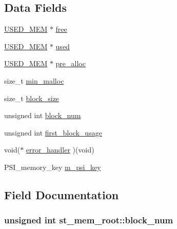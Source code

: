 \subsection*{Data Fields}
\begin{DoxyCompactItemize}
\item 
\hyperlink{my__alloc_8h_adcee356751476eb8212d707ab71a525c}{U\+S\+E\+D\+\_\+\+M\+E\+M} $\ast$ \hyperlink{structst__mem__root_a589eeca4f55433bbbce712b16d437d9b}{free}
\item 
\hyperlink{my__alloc_8h_adcee356751476eb8212d707ab71a525c}{U\+S\+E\+D\+\_\+\+M\+E\+M} $\ast$ \hyperlink{structst__mem__root_a119bc46a5b34383d7a82c32d7c1b9077}{used}
\item 
\hyperlink{my__alloc_8h_adcee356751476eb8212d707ab71a525c}{U\+S\+E\+D\+\_\+\+M\+E\+M} $\ast$ \hyperlink{structst__mem__root_ac93aa644c9eae6a4260929234d460117}{pre\+\_\+alloc}
\item 
size\+\_\+t \hyperlink{structst__mem__root_ae20a32941b57232d2fcf86e94ebb289e}{min\+\_\+malloc}
\item 
size\+\_\+t \hyperlink{structst__mem__root_a719ac747366fcfeef5dbd164fceaacdd}{block\+\_\+size}
\item 
unsigned int \hyperlink{structst__mem__root_a67bc70b3e0703bbab62a143ba407ddb8}{block\+\_\+num}
\item 
unsigned int \hyperlink{structst__mem__root_a6d11a091d78fba6e427962ed2521d048}{first\+\_\+block\+\_\+usage}
\item 
void($\ast$ \hyperlink{structst__mem__root_aed812c144fbd9a5f1281e693729db75d}{error\+\_\+handler} )(void)
\item 
P\+S\+I\+\_\+memory\+\_\+key \hyperlink{structst__mem__root_afd13e15db0a42ca22e6f20c33d4e9fb3}{m\+\_\+psi\+\_\+key}
\end{DoxyCompactItemize}


\subsection{Field Documentation}
\hypertarget{structst__mem__root_a67bc70b3e0703bbab62a143ba407ddb8}{}
\subsubsection[{block\+\_\+num}]{\setlength{\rightskip}{0pt plus 5cm}unsigned int st\+\_\+mem\+\_\+root\+::block\+\_\+num}\label{structst__mem__root_a67bc70b3e0703bbab62a143ba407ddb8}
\hypertarget{structst__mem__root_a719ac747366fcfeef5dbd164fceaacdd}{}
